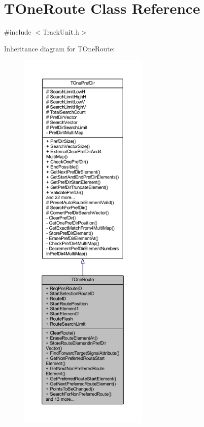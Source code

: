 \hypertarget{class_t_one_route}{}\section{T\+One\+Route Class Reference}
\label{class_t_one_route}


{\ttfamily \#include $<$Track\+Unit.\+h$>$}



Inheritance diagram for T\+One\+Route\+:\nopagebreak
\begin{figure}[H]
\begin{center}
\leavevmode
\includegraphics[height=550pt]{class_t_one_route__inherit__graph}
\end{center}
\end{figure}


